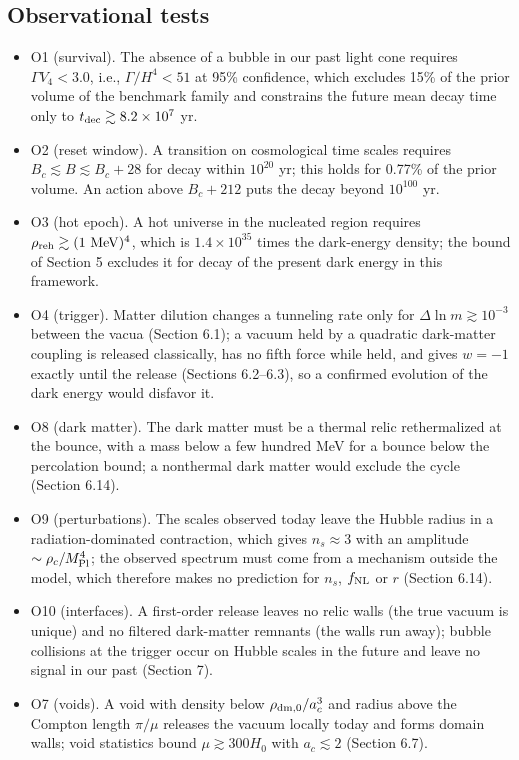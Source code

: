 \documentclass[11pt,a4paper]{article}
\begin{document}
\subsection{Observational tests}
\begin{itemize}\item O1 (survival). The absence of a bubble in our past light cone requires $\Gamma V_4<3.0$, i.e., $\Gamma/H^4<51$ at 95\% confidence, which excludes 15\% of the prior volume of the benchmark family and constrains the future mean decay time only to $t_{\rm dec}\gtrsim8.2\times10^{7}$ yr.
\item O2 (reset window). A transition on cosmological time scales requires $B_c\lesssim B\lesssim B_c+28$ for decay within $10^{20}$ yr; this holds for 0.77\% of the prior volume. An action above $B_c+212$ puts the decay beyond $10^{100}$ yr.
\item O3 (hot epoch). A hot universe in the nucleated region requires $\rho_{\rm reh}\gtrsim(1\ \mathrm{MeV})^4$, which is $1.4\times10^{35}$ times the dark-energy density; the bound of Section 5 excludes it for decay of the present dark energy in this framework.
\item O4 (trigger). Matter dilution changes a tunneling rate only for $\Delta\ln m\gtrsim10^{-3}$ between the vacua (Section 6.1); a vacuum held by a quadratic dark-matter coupling is released classically, has no fifth force while held, and gives $w=-1$ exactly until the release (Sections 6.2--6.3), so a confirmed evolution of the dark energy would disfavor it.
\item O8 (dark matter). The dark matter must be a thermal relic rethermalized at the bounce, with a mass below a few hundred MeV for a bounce below the percolation bound; a nonthermal dark matter would exclude the cycle (Section 6.14).
\item O9 (perturbations). The scales observed today leave the Hubble radius in a radiation-dominated contraction, which gives $n_s\approx3$ with an amplitude $\sim\rho_c/M_{\rm Pl}^4$; the observed spectrum must come from a mechanism outside the model, which therefore makes no prediction for $n_s$, $f_{\rm NL}$ or $r$ (Section 6.14).
\item O10 (interfaces). A first-order release leaves no relic walls (the true vacuum is unique) and no filtered dark-matter remnants (the walls run away); bubble collisions at the trigger occur on Hubble scales in the future and leave no signal in our past (Section 7).
\item O7 (voids). A void with density below $\rho_{\rm dm,0}/a_c^3$ and radius above the Compton length $\pi/\mu$ releases the vacuum locally today and forms domain walls; void statistics bound $\mu\gtrsim300H_0$ with $a_c\lesssim2$ (Section 6.7).

\end{itemize}
\end{document}
